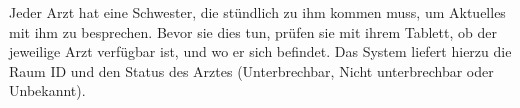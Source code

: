 Jeder Arzt hat eine Schwester, die stündlich zu ihm kommen muss, um Aktuelles mit ihm zu besprechen. Bevor sie dies tun, prüfen sie mit ihrem Tablett, ob der jeweilige Arzt verfügbar ist, und wo er sich befindet. Das System liefert hierzu die Raum ID und den Status des Arztes (Unterbrechbar, Nicht unterbrechbar oder Unbekannt).


